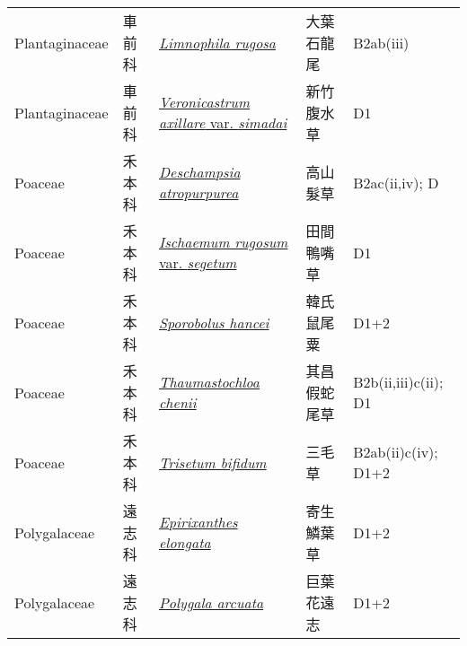 {\begin{longtable}{p{2.5cm}p{2cm}p{5cm}p{2.5cm}p{3cm}}
    Plantaginaceae & 車前科 & \href{http://www.theplantlist.org/tpl1.1/search?q=Limnophila+rugosa}{\textit{Limnophila rugosa} } & 大葉石龍尾 & B2ab(iii) \index{Limnophila@\textit{Limnophila}!rugosa@\textit{rugosa}}  \index{大葉石龍尾} \\
    Plantaginaceae & 車前科 & \href{http://www.theplantlist.org/tpl1.1/search?q=Veronicastrum+axillare+var.+simadai}{\textit{Veronicastrum axillare} var. \textit{simadai} } & 新竹腹水草 & D1 \index{Veronicastrum@\textit{Veronicastrum}!axillare@\textit{axillare}!var. simadai@var. \textit{simadai}}  \index{新竹腹水草} \\
    Poaceae & 禾本科 & \href{http://www.theplantlist.org/tpl1.1/search?q=Deschampsia+atropurpurea}{\textit{Deschampsia atropurpurea} } & 高山髮草 & B2ac(ii,iv); D \index{Deschampsia@\textit{Deschampsia}!atropurpurea@\textit{atropurpurea}}  \index{高山髮草} \\
    Poaceae & 禾本科 & \href{http://www.theplantlist.org/tpl1.1/search?q=Ischaemum+rugosum+var.+segetum}{\textit{Ischaemum rugosum} var. \textit{segetum} } & 田間鴨嘴草 & D1 \index{Ischaemum@\textit{Ischaemum}!rugosum@\textit{rugosum}!var. segetum@var. \textit{segetum}}  \index{田間鴨嘴草} \\
    Poaceae & 禾本科 & \href{http://www.theplantlist.org/tpl1.1/search?q=Sporobolus+hancei}{\textit{Sporobolus hancei} } & 韓氏鼠尾粟 & D1+2 \index{Sporobolus@\textit{Sporobolus}!hancei@\textit{hancei}}  \index{韓氏鼠尾粟} \\
    Poaceae & 禾本科 & \href{http://www.theplantlist.org/tpl1.1/search?q=Thaumastochloa+chenii}{\textit{Thaumastochloa chenii} } & 其昌假蛇尾草 & B2b(ii,iii)c(ii); D1 \index{Thaumastochloa@\textit{Thaumastochloa}!chenii@\textit{chenii}}  \index{其昌假蛇尾草} \\
    Poaceae & 禾本科 & \href{http://www.theplantlist.org/tpl1.1/search?q=Trisetum+bifidum}{\textit{Trisetum bifidum} } & 三毛草 & B2ab(ii)c(iv); D1+2 \index{Trisetum@\textit{Trisetum}!bifidum@\textit{bifidum}}  \index{三毛草} \\
    Polygalaceae & 遠志科 & \href{http://www.theplantlist.org/tpl1.1/search?q=Epirixanthes+elongata}{\textit{Epirixanthes elongata} } & 寄生鱗葉草 & D1+2 \index{Epirixanthes@\textit{Epirixanthes}!elongata@\textit{elongata}}  \index{寄生鱗葉草} \\
    Polygalaceae & 遠志科 & \href{http://www.theplantlist.org/tpl1.1/search?q=Polygala+arcuata}{\textit{Polygala arcuata} } & 巨葉花遠志 & D1+2 \index{Polygala@\textit{Polygala}!arcuata@\textit{arcuata}}  \index{巨葉花遠志} \\

\end{longtable}}
